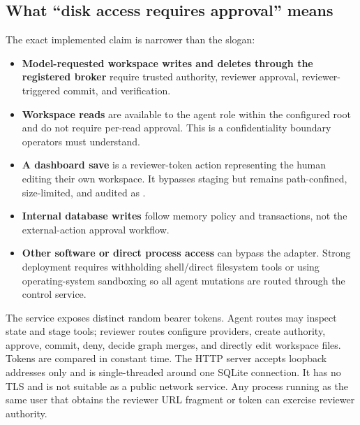 \subsection{What ``disk access requires approval'' means}

The exact implemented claim is narrower than the slogan:

\begin{itemize}
  \item \textbf{Model-requested workspace writes and deletes through the registered broker} require trusted authority, reviewer approval, reviewer-triggered commit, and verification.
  \item \textbf{Workspace reads} are available to the agent role within the configured root and do not require per-read approval. This is a confidentiality boundary operators must understand.
  \item \textbf{A dashboard save} is a reviewer-token action representing the human editing their own workspace. It bypasses staging but remains path-confined, size-limited, and audited as .
  \item \textbf{Internal database writes} follow memory policy and transactions, not the external-action approval workflow.
  \item \textbf{Other software or direct process access} can bypass the adapter. Strong deployment requires withholding shell/direct filesystem tools or using operating-system sandboxing so all agent mutations are routed through the control service.
\end{itemize}

The service exposes distinct random bearer tokens. Agent routes may inspect state and stage tools; reviewer routes configure providers, create authority, approve, commit, deny, decide graph merges, and directly edit workspace files. Tokens are compared in constant time. The HTTP server accepts loopback addresses only and is single-threaded around one SQLite connection. It has no TLS and is not suitable as a public network service. Any process running as the same user that obtains the reviewer URL fragment or token can exercise reviewer authority.


